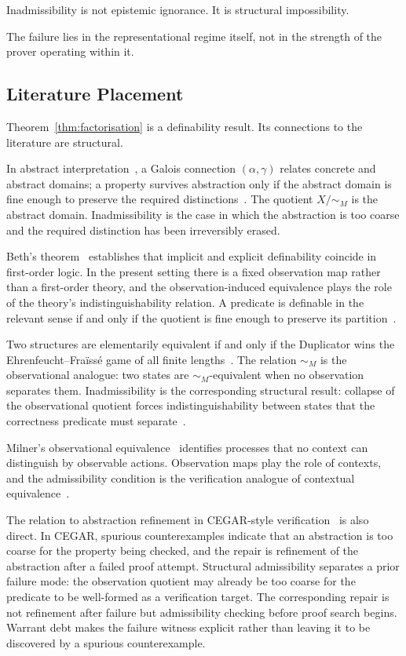 \documentclass[pdflatex,sn-mathphys-num]{sn-jnl}
\theoremstyle{plain}
\theoremstyle{definition}
\theoremstyle{remark}
\begin{document}
Inadmissibility is not epistemic ignorance.
It is structural impossibility.

The failure lies in the representational regime itself, not in the
strength of the prover operating within it.

\subsection{Literature Placement}
\label{subsec:literature}

Theorem~\ref{thm:factorisation} is a definability result.
Its connections to the literature are structural.

In abstract interpretation~\cite{cousot1977,cousot1979}, a Galois
connection $(\alpha,\gamma)$ relates concrete and abstract domains;
a property survives abstraction only if the abstract domain is fine
enough to preserve the required distinctions~\cite{cousot2002,giacobazzi1998}.
The quotient $X/{\sim_M}$ is the abstract domain.
Inadmissibility is the case in which the abstraction is too coarse
and the required distinction has been irreversibly erased.

Beth's theorem~\cite{beth1953} establishes that implicit and explicit
definability coincide in first-order logic.
In the present setting there is a fixed observation map rather than a
first-order theory, and the observation-induced equivalence plays the
role of the theory's indistinguishability relation.
A predicate is definable in the relevant sense if and only if the
quotient is fine enough to preserve its partition~\cite{hodges1993}.

Two structures are elementarily equivalent if and only if the
Duplicator wins the Ehrenfeucht--Fra\"{i}ss\'{e} game of all finite
lengths~\cite{ehrenfeucht1961,fraisse1954}.
The relation $\sim_M$ is the observational analogue: two states are
$\sim_M$-equivalent when no observation separates them.
Inadmissibility is the corresponding structural result: collapse of
the observational quotient forces indistinguishability between states
that the correctness predicate must separate~\cite{libkin2004}.

Milner's observational equivalence~\cite{milner1980,milner1989}
identifies processes that no context can distinguish by observable
actions.
Observation maps play the role of contexts, and the admissibility
condition is the verification analogue of contextual
equivalence~\cite{sangiorgi2011}.

The relation to abstraction refinement in CEGAR-style
verification~\cite{clarke2003} is also direct.
In CEGAR, spurious counterexamples indicate that an abstraction is too
coarse for the property being checked, and the repair is refinement of
the abstraction after a failed proof attempt.
Structural admissibility separates a prior failure mode: the observation
quotient may already be too coarse for the predicate to be well-formed as
a verification target.
The corresponding repair is not refinement after failure but admissibility
checking before proof search begins.
Warrant debt makes the failure witness explicit rather than leaving it to
be discovered by a spurious counterexample.
\end{document}
